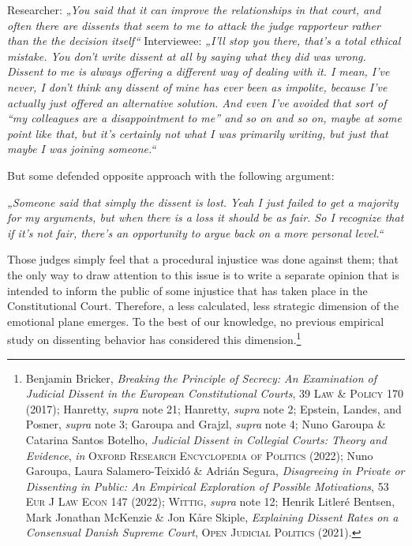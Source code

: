 \documentclass[
  11pt,
]{article}
\begin{document}
Researcher: \emph{„You said that it can improve the relationships in that court, and often there are dissents that seem to me to attack the judge rapporteur rather than the the decision itself``}
Interviewee: \emph{„I'll stop you there, that's a total ethical mistake. You don't write dissent at all by saying what they did was wrong. Dissent to me is always offering a different way of dealing with it. I mean, I've never, I don't think any dissent of mine has ever been as impolite, because I've actually just offered an alternative solution. And even I've avoided that sort of ``my colleagues are a disappointment to me'' and so on and so on, maybe at some point like that, but it's certainly not what I was primarily writing, but just that maybe I was joining someone.``}

But some defended opposite approach with the following argument:

\emph{„Someone said that simply the dissent is lost. Yeah I just failed to get a majority for my arguments, but when there is a loss it should be as fair. So I recognize that if it's not fair, there's an opportunity to argue back on a more personal level.``}

Those judges simply feel that a procedural injustice was done against them; that the only way to draw attention to this issue is to write a separate opinion that is intended to inform the public of some injustice that has taken place in the Constitutional Court. Therefore, a less calculated, less strategic dimension of the emotional plane emerges. To the best of our knowledge, no previous empirical study on dissenting behavior has considered this dimension.\footnote{Benjamin Bricker, \emph{Breaking the {Principle} of {Secrecy}: {An Examination} of {Judicial Dissent} in the {European Constitutional Courts}}, 39 \textsc{Law \& Policy} 170 (2017); Hanretty, \emph{supra} note 21; Hanretty, \emph{supra} note 2; Epstein, Landes, and Posner, \emph{supra} note 3; Garoupa and Grajzl, \emph{supra} note 4; Nuno Garoupa \& Catarina Santos Botelho, \emph{Judicial {Dissent} in {Collegial Courts}: {Theory} and {Evidence}}, \emph{in} \textsc{Oxford {Research Encyclopedia} of {Politics}} (2022); Nuno Garoupa, Laura Salamero-Teixidó \& Adrián Segura, \emph{Disagreeing in Private or Dissenting in Public: An Empirical Exploration of Possible Motivations}, 53 \textsc{Eur J Law Econ} 147 (2022); \textsc{Wittig}, \emph{supra} note 12; Henrik Litleré Bentsen, Mark Jonathan McKenzie \& Jon Kåre Skiple, \emph{Explaining {Dissent Rates} on a {Consensual Danish Supreme Court}}, \textsc{Open Judicial Politics} (2021).}
\end{document}
